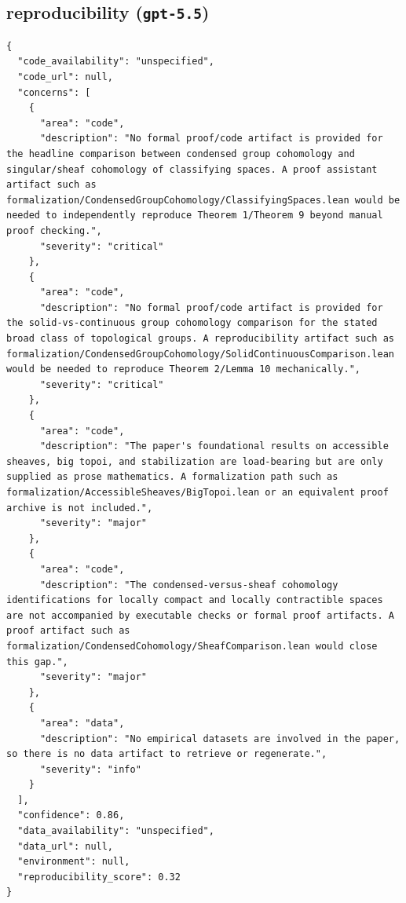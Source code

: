 \documentclass[11pt]{article}
\begin{document}
\subsection*{reproducibility (\texttt{gpt-5.5})}
\begin{verbatim}
{
  "code_availability": "unspecified",
  "code_url": null,
  "concerns": [
    {
      "area": "code",
      "description": "No formal proof/code artifact is provided for the headline comparison between condensed group cohomology and singular/sheaf cohomology of classifying spaces. A proof assistant artifact such as formalization/CondensedGroupCohomology/ClassifyingSpaces.lean would be needed to independently reproduce Theorem 1/Theorem 9 beyond manual proof checking.",
      "severity": "critical"
    },
    {
      "area": "code",
      "description": "No formal proof/code artifact is provided for the solid-vs-continuous group cohomology comparison for the stated broad class of topological groups. A reproducibility artifact such as formalization/CondensedGroupCohomology/SolidContinuousComparison.lean would be needed to reproduce Theorem 2/Lemma 10 mechanically.",
      "severity": "critical"
    },
    {
      "area": "code",
      "description": "The paper's foundational results on accessible sheaves, big topoi, and stabilization are load-bearing but are only supplied as prose mathematics. A formalization path such as formalization/AccessibleSheaves/BigTopoi.lean or an equivalent proof archive is not included.",
      "severity": "major"
    },
    {
      "area": "code",
      "description": "The condensed-versus-sheaf cohomology identifications for locally compact and locally contractible spaces are not accompanied by executable checks or formal proof artifacts. A proof artifact such as formalization/CondensedCohomology/SheafComparison.lean would close this gap.",
      "severity": "major"
    },
    {
      "area": "data",
      "description": "No empirical datasets are involved in the paper, so there is no data artifact to retrieve or regenerate.",
      "severity": "info"
    }
  ],
  "confidence": 0.86,
  "data_availability": "unspecified",
  "data_url": null,
  "environment": null,
  "reproducibility_score": 0.32
}
\end{verbatim}
\end{document}
